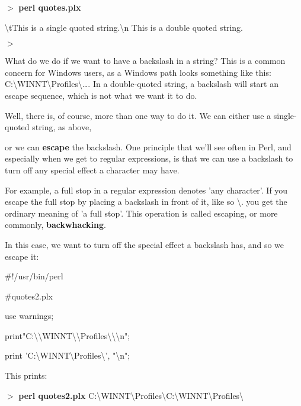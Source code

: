 \documentclass[a4paper,11pt]{book}
\begin{document}
\noindent $>$ \textbf{perl quotes.plx}

\noindent \textbackslash tThis is a single quoted string.\textbackslash n This is a double quoted string.

\noindent $>$

\noindent 

\noindent What do we do if we want to have a backslash in a string? This is a common concern for Windows users, as a Windows path looks something like this: C:\textbackslash WINNT\textbackslash Profiles\textbackslash \dots . In a double-quoted string, a backslash will start an escape sequence, which is not what we want it to do.

\noindent 

\noindent Well, there is, of course, more than one way to do it. We can either use a single-quoted string, as above,

\noindent or we can \textbf{escape }the backslash. One principle that we'll see often in Perl, and especially when we get to regular expressions, is that we can use a backslash to turn off any special effect a character may have.

\noindent For example, a full stop in a regular expression denotes 'any character'. If you escape the full stop by placing a backslash in front of it, like so \textbackslash . you get the ordinary meaning of 'a full stop'. This operation is called escaping, or more commonly, \textbf{backwhacking}.

\noindent 

\noindent In this case, we want to turn off the special effect a backslash has, and so we escape it:

\noindent 

\noindent \#!/usr/bin/perl

\noindent \#quotes2.plx

\noindent use warnings;

\noindent print"C:\textbackslash \textbackslash WINNT\textbackslash \textbackslash Profiles\textbackslash \textbackslash \textbackslash n";

\noindent print 'C:\textbackslash WINNT\textbackslash Profiles\textbackslash  ', "\textbackslash n";

\noindent 

\noindent This prints:

\noindent 

\noindent $>$ \textbf{perl quotes2.plx }C:\textbackslash WINNT\textbackslash Profiles\textbackslash  C:\textbackslash WINNT\textbackslash Profiles\textbackslash 
\end{document}
